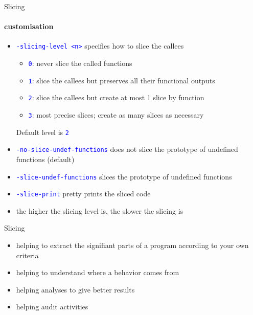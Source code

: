 \documentclass{beamer}
\newcommand{\orange}[1]{{\textcolor{frama-c-1}{#1}}}
\newcommand{\bleu}[1]{{\textcolor{blue}{#1}}}
\newcommand{\code}[1]{\bleu{\texttt{#1}}}
\newenvironment{sect}[1]{\orange{#1}\begin{itemize}}{\end{itemize}}
\newenvironment{whatitisgoodfor}{\begin{sect}{What is it good for}}{\end{sect}}
\begin{document}
\begin{frame}{Slicing}
\framesubtitle{customisation}

\begin{sect}{Custom options}
\item \code{-slicing-level <n>} specifies how to slice the callees
  \begin{itemize}
  \item \code{0}: never slice the called functions
  \item \code{1}: slice the callees but preserves all their functional outputs
  \item \code{2}: slice the callees but create at most 1 slice by function
  \item \code{3}: most precise slices; create as many slices as necessary
  \end{itemize}
  Default level is \code{2}
\item \code{-no-slice-undef-functions} does not slice the prototype of
  undefined functions (default)
\item \code{-slice-undef-functions} slices the prototype of undefined functions
\item \code{-slice-print} pretty prints the sliced code
\end{sect}

\begin{sect}{Warning}
\item the higher the slicing level is, the slower the slicing is
\end{sect}

\end{frame}


\begin{frame}{Slicing}

\begin{whatitisgoodfor}
\item helping to extract the signifiant parts of a program according to your
  own criteria
\item helping to understand where a behavior comes from
\item helping analyses to give better results
\item helping audit activities 
\end{whatitisgoodfor}

\end{frame}

\end{document}
